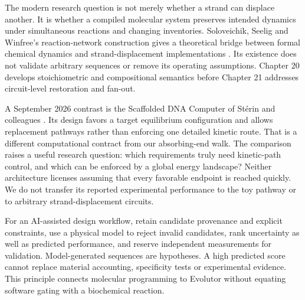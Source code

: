 The modern research question is not merely whether a strand can displace
another. It is whether a compiled molecular system preserves intended dynamics
under simultaneous reactions and changing inventories. Soloveichik, Seelig and
Winfree's reaction-network construction gives a theoretical bridge between
formal chemical dynamics and strand-displacement implementations \cite{crn}.
Its existence does not validate arbitrary sequences or remove its operating
assumptions. Chapter 20 develops stoichiometric and compositional semantics
before Chapter 21 addresses circuit-level restoration and fan-out.

A September 2026 contrast is the Scaffolded DNA Computer of Stérin and
colleagues \cite{sterin}. Its design favors a target equilibrium configuration
and allows replacement pathways rather than enforcing one detailed kinetic
route. That is a different computational contract from our absorbing-end walk.
The comparison raises a useful research question: which requirements truly
need kinetic-path control, and which can be enforced by a global energy
landscape? Neither architecture licenses assuming that every favorable endpoint
is reached quickly. We do not transfer its reported experimental performance
to the toy pathway or to arbitrary strand-displacement circuits.

For an AI-assisted design workflow, retain candidate provenance and explicit
constraints, use a physical model to reject invalid candidates, rank uncertainty
as well as predicted performance, and reserve independent measurements for
validation. Model-generated sequences are hypotheses. A high predicted score
cannot replace material accounting, specificity tests or experimental evidence.
This principle connects molecular programming to Evolutor without equating
software gating with a biochemical reaction.

